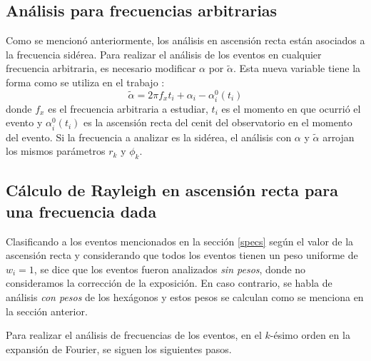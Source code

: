   \subsection{Análisis para frecuencias arbitrarias}
  Como se mencionó anteriormente, los análisis en ascensión recta están asociados a la frecuencia sidérea. Para realizar el análisis de los eventos en cualquier frecuencia arbitraria, es necesario modificar $\alpha$ por $\tilde{\alpha}$. Esta nueva variable tiene la forma como se utiliza en el trabajo \cite{taborda}:
  \begin{equation}
    \tilde{\alpha} = 2\pi f_x t_i + \alpha_i - \alpha_i^0(t_i) \label{ra_mod}
  \end{equation}
  donde $f_x$ es el frecuencia arbitraria a estudiar, $t_i$ es el momento en que ocurrió el evento y $\alpha_i^0(t_i)$ es la ascensión recta del cenit del observatorio en el momento del evento. Si la frecuencia a analizar es la sidérea, el análisis con $\alpha$ y $\tilde{\alpha}$ arrojan los mismos parámetros $r_k$ y $\phi_k$.


 \subsection{Cálculo de Rayleigh en ascensión recta para una frecuencia dada} \label{rayleigh}
 Clasificando a los eventos mencionados en la sección \ref{specs} según el valor de la ascensión recta y considerando que todos los eventos tienen un peso uniforme de $w_i=1$, se dice que los eventos fueron analizados \textit{sin pesos}, donde no consideramos la corrección de la exposición. En caso contrario, se habla de análisis \textit{con pesos} de los hexágonos  y estos pesos se calculan como se menciona en la sección anterior.

 Para realizar el análisis de frecuencias de los eventos, en el $k$-ésimo orden en la expansión de Fourier, se siguen los siguientes pasos.


